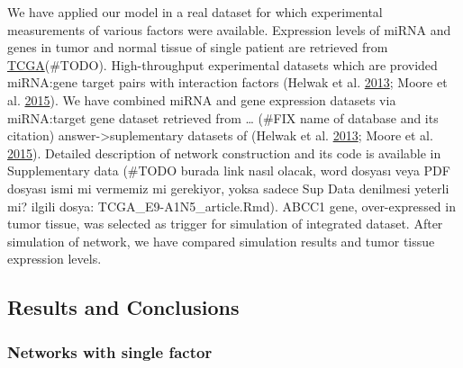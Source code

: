 \documentclass[]{article}
\begin{document}
We have applied our model in a real dataset for which experimental
measurements of various factors were available. Expression levels of
miRNA and genes in tumor and normal tissue of single patient are
retrieved from
\href{https://www.cancer.gov/about-nci/organization/ccg/research/structural-genomics/tcga}{TCGA}(\#TODO).
High-throughput experimental datasets which are provided miRNA:gene
target pairs with interaction factors (Helwak et al.
\protect\hyperlink{ref-helwak_mapping_2013}{2013}; Moore et al.
\protect\hyperlink{ref-moore_mirnatarget_2015}{2015}). We have combined
miRNA and gene expression datasets via miRNA:target gene dataset
retrieved from \ldots{} (\#FIX name of database and its citation)
answer-\textgreater{}suplementary datasets of (Helwak et al.
\protect\hyperlink{ref-helwak_mapping_2013}{2013}; Moore et al.
\protect\hyperlink{ref-moore_mirnatarget_2015}{2015}). Detailed
description of network construction and its code is available in
Supplementary data (\#TODO burada link nasıl olacak, word dosyası veya
PDF dosyası ismi mi vermemiz mi gerekiyor, yoksa sadece Sup Data
denilmesi yeterli mi? ilgili dosya: TCGA\_E9-A1N5\_article.Rmd). ABCC1
gene, over-expressed in tumor tissue, was selected as trigger for
simulation of integrated dataset. After simulation of network, we have
compared simulation results and tumor tissue expression levels.

\hypertarget{results-and-conclusions}{%
\subsection{Results and Conclusions}\label{results-and-conclusions}}

\hypertarget{networks-with-single-factor}{%
\subsubsection{Networks with single
factor}\label{networks-with-single-factor}}
\end{document}
